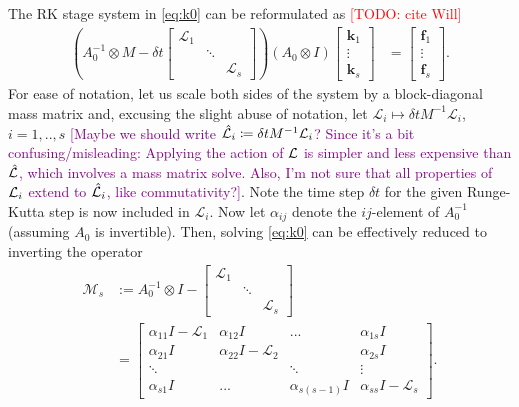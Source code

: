 \documentclass[review]{siamart}
\makeatletter
\newcommand{\tcp}{\textcolor{purple}}
\newcommand{\todo}[1]{\textcolor{red}{[TODO\@: #1]}}
\makeatother
\begin{document}
The RK stage system in \eqref{eq:k0} can be reformulated as \todo{cite Will}
%
\begin{align}\label{eq:keq}
\left( A_0^{-1}\otimes M - \delta t \begin{bmatrix} \mathcal{L}_1  & \\ & \ddots \\ && \mathcal{L}_s\end{bmatrix}\right)
	(A_0\otimes I)	\begin{bmatrix} \mathbf{k}_1 \\ \vdots \\ \mathbf{k}_s \end{bmatrix} 
& = \begin{bmatrix} \mathbf{f}_1 \\ \vdots \\ \mathbf{f}_s \end{bmatrix}.
\end{align}
%
For ease of notation, let us scale both sides of the system by a block-diagonal mass matrix 
and, excusing the slight abuse of notation, let $\mathcal{L}_i \mapsto \delta t M^{-1}\mathcal{L}_i$,
$i=1,..,s$ \tcp{[Maybe we should write $\hat{\cal L}_i \coloneqq \delta t M^{-1}\mathcal{L}_i$? Since it's a bit confusing/misleading: Applying the action of ${\cal L}$ is simpler and less expensive than $\hat{\cal L}$, which involves a mass matrix solve. Also, I'm not sure that all properties of ${\cal L}_i$ extend to $\hat{\cal L}_i$, like commutativity?]}. Note the time step $\delta t$ for the given Runge-Kutta step is now included in $\mathcal{L}_i$. Now let $\alpha_{ij}$ denote the $ij$-element of $A_0^{-1}$ (assuming $A_0$ is
invertible). Then, solving \eqref{eq:k0} can be effectively reduced to inverting the operator
%
\begin{align}\nonumber
\mathcal{M}_s & := A_0^{-1}\otimes I - \begin{bmatrix} \mathcal{L}_1  & \\ & \ddots \\ && \mathcal{L}_s\end{bmatrix} \\
& = \begin{bmatrix} \alpha_{11}I - \mathcal{L}_1 & \alpha_{12}I & ... & \alpha_{1s}I \\
	\alpha_{21}I & \alpha_{22}I - \mathcal{L}_2 & & \alpha_{2s}I \\
	\ddots & & \ddots & \vdots \\ \alpha_{s1}I & ... & \alpha_{s(s-1)}I & \alpha_{ss}I - \mathcal{L}_s \end{bmatrix}.
	\label{eq:k1}
\end{align}
%
\end{document}
